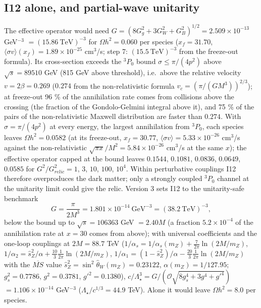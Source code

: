 \documentclass[
  10pt,
]{article}
\begin{document}
\hypertarget{i12-alone-and-partial-wave-unitarity}{%
\subsection{I12 alone, and partial-wave
unitarity}\label{i12-alone-and-partial-wave-unitarity}}

The effective operator would need
\(G = (8G_g^2 + 3G_W^2 + G_B^2)^{1/2} = 2.509\times10^{-13}\)
GeV\(^{-3}\) \(= (15.86\ \text{TeV})^{-3}\) for \(\Omega h^2 = 0.060\)
per species (\(x_f = 31.70\),
\(\langle\sigma v\rangle(x_f) = 1.89\times10^{-25}\) cm\(^3\)/s; step 7:
\((15.5\ \text{TeV})^{-3}\) from the freeze-out formula). Its
cross-section exceeds the \(^3P_0\) bound \(\sigma \le \pi/(4p^2)\)
above \(\sqrt s = 89510\) GeV (815 GeV above threshold), i.e.~above the
relative velocity \(v = 2\beta = 0.269\) (\(0.274\) from the
non-relativistic formula \(v_c = (\pi/(GM^3))^{2/3}\)); at freeze-out 96
\% of the annihilation rate comes from collisions above the crossing
(the fraction of the Gondolo-Gelmini integral above it), and 75 \% of
the pairs of the non-relativistic Maxwell distribution are faster than
\(0.274\). With \(\sigma = \pi/(4p^2)\) at every energy, the largest
annihilation from \(^3P_0\), each species leaves \(\Omega h^2 = 0.0582\)
(at its freeze-out, \(x_f = 30.77\),
\(\langle\sigma v\rangle = 5.33\times10^{-26}\) cm\(^3\)/s against the
non-relativistic \(\sqrt{\pi x}/M^2 = 5.84\times10^{-26}\) cm\(^3\)/s at
the same \(x\)); the effective operator capped at the bound leaves
\(0.1544\), \(0.1081\), \(0.0836\), \(0.0649\), \(0.0585\) for
\(G^2/G^2_{relic} = 1\), \(3\), \(10\), \(100\), \(10^4\). Within
perturbative couplings I12 therefore overproduces the dark matter; only
a strongly coupled \(^3P_0\) channel at the unitarity limit could give
the relic. Version 3 sets I12 to the unitarity-safe benchmark
\[ G = \frac{\pi}{2M^3} = 1.801\times10^{-14}\ \text{GeV}^{-3} = (38.2\ \text{TeV})^{-3}, \]
below the bound up to \(\sqrt s = 106363\) GeV \(= 2.40M\) (a fraction
\(5.2\times10^{-4}\) of the annihilation rate at \(x = 30\) comes from
above); with universal coefficients and the one-loop couplings at
\(2M = 88.7\) TeV
(\(1/\alpha_s = 1/\alpha_s(m_Z) + \frac{7}{2\pi}\ln(2M/m_Z)\),
\(1/\alpha_2 = \hat s_Z^2/\alpha + \frac{10}{3}\frac{1}{2\pi}\ln(2M/m_Z)\),
\(1/\alpha_1 = (1 - \hat s_Z^2)/\alpha - \frac{20}{3}\frac{1}{2\pi}\ln(2M/m_Z)\)
with the \(\overline{MS}\) value
\(\hat s_Z^2 = \sin^2\hat\theta_W(m_Z) = 0.23122\),
\(\alpha(m_Z) = 1/127.95\); \(g_s^2 = 0.7786\), \(g^2 = 0.3781\),
\(g'^2 = 0.1380\)),
\(c/\Lambda_\star^3 = G/(\mathcal O\sqrt{8g_s^4 + 3g^4 + g'^4})\)
\(= 1.106\times10^{-14}\) GeV\(^{-3}\) (\(\Lambda_\star/c^{1/3} = 44.9\)
TeV). Alone it would leave \(\Omega h^2 = 8.0\) per species.
\end{document}
